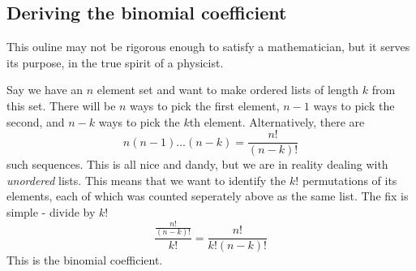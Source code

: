 \documentclass[10pt,a4paper]{amsart}
\begin{document}
\begin{appendices}
\section{Deriving the binomial coefficient}
\label{app:binom}
This ouline may not be rigorous enough to satisfy a mathematician, but it serves its purpose, in the true spirit of a physicist.

Say we have an $n$ element set and want to make ordered lists of length $k$ from this set. There will be $n$ ways to pick the first element, $n-1$ ways to pick the second, and $n-k$ ways to pick the $k$th element. Alternatively, there are
\begin{equation}
n(n-1)\dots(n-k)=\frac{n!}{(n-k)!}
\end{equation}
such sequences.
This is all nice and dandy, but we are in reality dealing with \emph{unordered} lists. This means that we want to identify the $k!$ permutations of its elements, each of which was counted seperately above as the same list. The fix is simple - divide by $k!$
\begin{equation}
\frac{\frac{n!}{(n-k)!}}{k!}=\frac{n!}{k!(n-k)!}
\end{equation}
This is the binomial coefficient.
\end{appendices}
\end{document}
